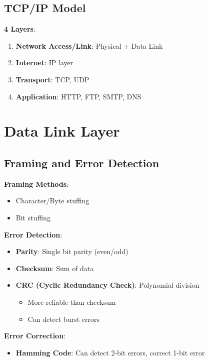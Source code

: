 \documentclass[12pt,a4paper]{report}
\begin{document}
\subsection{TCP/IP Model}
\begin{concept}
\textbf{4 Layers}:
\begin{enumerate}
    \item \textbf{Network Access/Link}: Physical + Data Link
    \item \textbf{Internet}: IP layer
    \item \textbf{Transport}: TCP, UDP
    \item \textbf{Application}: HTTP, FTP, SMTP, DNS
\end{enumerate}
\end{concept}

\section{Data Link Layer}

\subsection{Framing and Error Detection}
\begin{concept}
\textbf{Framing Methods}:
\begin{itemize}
    \item Character/Byte stuffing
    \item Bit stuffing
\end{itemize}

\textbf{Error Detection}:
\begin{itemize}
    \item \textbf{Parity}: Single bit parity (even/odd)
    \item \textbf{Checksum}: Sum of data
    \item \textbf{CRC (Cyclic Redundancy Check)}: Polynomial division
        \begin{itemize}
            \item More reliable than checksum
            \item Can detect burst errors
        \end{itemize}
\end{itemize}

\textbf{Error Correction}:
\begin{itemize}
    \item \textbf{Hamming Code}: Can detect 2-bit errors, correct 1-bit error
\end{itemize}
\end{concept}
\end{document}
